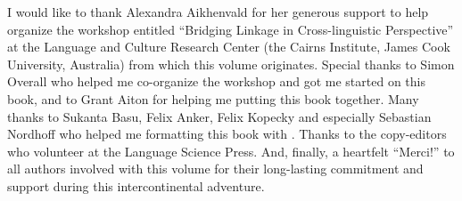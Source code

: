 \begin{refsection}

I would like to thank Alexandra Aikhenvald for her generous support to help organize the workshop entitled ``Bridging Linkage in Cross-linguistic Perspective'' at the Language and Culture Research Center (the Cairns Institute, James Cook University, Australia) from which this volume originates. Special thanks to Simon Overall who helped me co-organize the workshop and got me started on this book, and to Grant Aiton for helping me putting this book together. Many thanks to Sukanta Basu, Felix Anker, Felix Kopecky and especially Sebastian Nordhoff who helped me formatting this book with \XeLaTeX. Thanks to the  copy-editors who volunteer at the Language Science Press. And, finally, a heartfelt ``Merci!'' to all authors involved with this volume for their long-lasting commitment and support during this intercontinental adventure.

\printbibliography[heading=subbibliography]
\end{refsection}